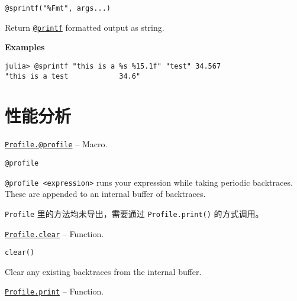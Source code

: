 \begin{adjustwidth}{2em}{0pt}


\begin{verbatim}
@sprintf("%Fmt", args...)
\end{verbatim}

Return \hyperlink{13954719910189591998}{\texttt{@printf}} formatted output as string.

\textbf{Examples}


\begin{verbatim}
julia> @sprintf "this is a %s %15.1f" "test" 34.567
"this is a test            34.6"
\end{verbatim}



\end{adjustwidth}

\hypertarget{13446659783021526147}{}


\chapter{性能分析}


\hypertarget{9691715859147716436}{}
\hyperlink{9691715859147716436}{\texttt{Profile.@profile}}  -- {Macro.}

\begin{adjustwidth}{2em}{0pt}


\begin{verbatim}
@profile
\end{verbatim}

\texttt{@profile <expression>} runs your expression while taking periodic backtraces. These are appended to an internal buffer of backtraces.



\end{adjustwidth}

\texttt{Profile} 里的方法均未导出，需要通过 \texttt{Profile.print()} 的方式调用。


\hypertarget{15414823368700214048}{}
\hyperlink{15414823368700214048}{\texttt{Profile.clear}}  -- {Function.}

\begin{adjustwidth}{2em}{0pt}


\begin{verbatim}
clear()
\end{verbatim}

Clear any existing backtraces from the internal buffer.



\end{adjustwidth}
\hypertarget{2955792207246042270}{}
\hyperlink{2955792207246042270}{\texttt{Profile.print}}  -- {Function.}

